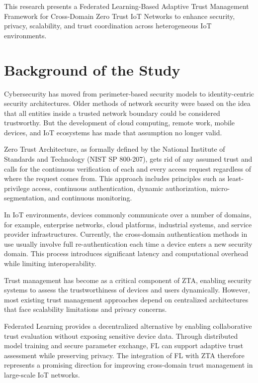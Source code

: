 This research presents a Federated Learning-Based Adaptive Trust Management Framework for Cross-Domain Zero Trust IoT Networks to enhance security, privacy, scalability, and trust coordination across heterogeneous IoT environments.


\section{Background of the Study}

Cybersecurity has moved from perimeter-based security models to identity-centric security architectures. Older methods of network security were based on the idea that all entities inside a trusted network boundary could be considered trustworthy. But the development of cloud computing, remote work, mobile devices, and IoT ecosystems has made that assumption no longer valid.


Zero Trust Architecture, as formally defined by the National Institute of Standards and Technology (NIST SP 800-207), gets rid of any assumed trust and calls for the continuous verification of each and every access request regardless of where the request comes from. This approach includes principles such as least-privilege access, continuous authentication, dynamic authorization, micro-segmentation, and continuous monitoring.


In IoT environments, devices commonly communicate over a number of domains, for example, enterprise networks, cloud platforms, industrial systems, and service provider infrastructures. Currently, the cross-domain authentication methods in use usually involve full re-authentication each time a device enters a new security domain. This process introduces significant latency and computational overhead while limiting interoperability.


Trust management has become as a critical component of ZTA, enabling security systems to assess the trustworthiness of devices and users dynamically. However, most existing trust management approaches depend on centralized architectures that face scalability limitations and privacy concerns.


Federated Learning provides a decentralized alternative by enabling collaborative trust evaluation without exposing sensitive device data. Through distributed model training and secure parameter exchange, FL can support adaptive trust assessment while preserving privacy. The integration of FL with ZTA therefore represents a promising direction for improving cross-domain trust management in large-scale IoT networks.


